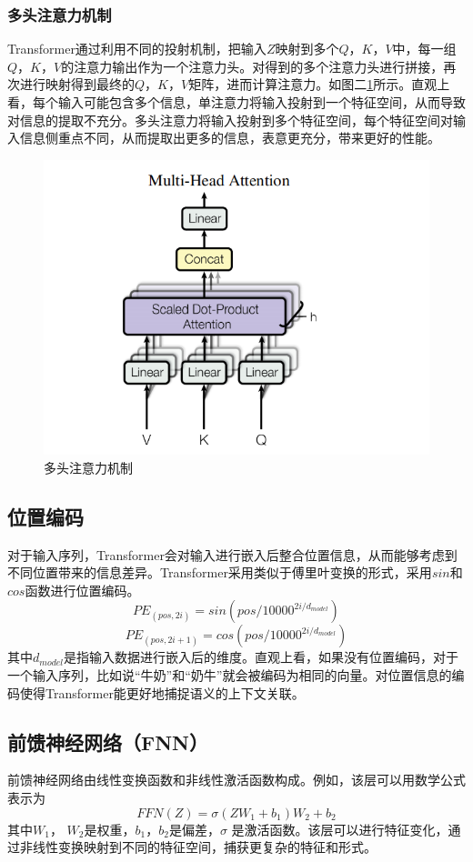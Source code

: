 \documentclass[journal]{IEEEtran}
\begin{document}
\subsubsection{多头注意力机制}
Transformer通过利用不同的投射机制，把输入$Z$映射到多个$Q$，$K$，$V$中，每一组$Q$，$K$，$V$的注意力输出作为一个注意力头。对得到的多个注意力头进行拼接，再次进行映射得到最终的$Q$，$K$，$V$矩阵，进而计算注意力。如图二\ref*{figure2}所示。直观上看，每个输入可能包含多个信息，单注意力将输入投射到一个特征空间，从而导致对信息的提取不充分。多头注意力将输入投射到多个特征空间，每个特征空间对输入信息侧重点不同，从而提取出更多的信息，表意更充分，带来更好的性能。
\begin{figure}[h]
    \centering
    \includegraphics[width=\columnwidth]{image.png}
    \caption{多头注意力机制}
    \label{figure2}
    \end{figure}

\subsection{位置编码}
对于输入序列，Transformer会对输入进行嵌入后整合位置信息，从而能够考虑到不同位置带来的信息差异。Transformer采用类似于傅里叶变换的形式，采用$sin$和$cos$函数进行位置编码。
$$PE_{(pos,2i)} = sin(pos/10000^{2i/d_{model}})$$ 
$$PE_{(pos,2i+1)} = cos(pos/10000^{2i/d_{model}})$$ 
其中$d_{model}$是指输入数据进行嵌入后的维度。直观上看，如果没有位置编码，对于一个输入序列，比如说“牛奶”和“奶牛”就会被编码为相同的向量。对位置信息的编码使得Transformer能更好地捕捉语义的上下文关联。

\subsection{前馈神经网络（FNN）}
前馈神经网络由线性变换函数和非线性激活函数构成。例如，该层可以用数学公式表示为
$$FFN(Z) = \sigma (ZW_1 + b_1)W_2 + b_2$$
其中$W_1$， $W_2$是权重，$b_1$，$b_2$是偏差，$\sigma$ 是激活函数。该层可以进行特征变化，通过非线性变换映射到不同的特征空间，捕获更复杂的特征和形式。
\end{document}

